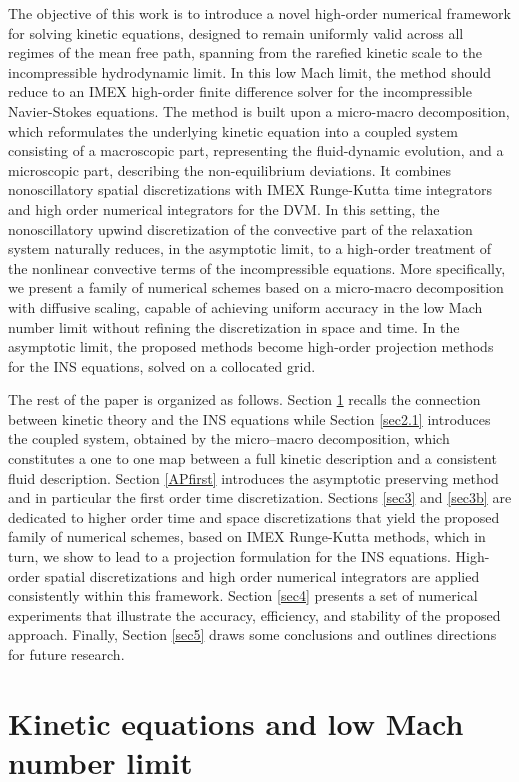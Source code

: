 \documentclass[final,11pt]{siamart251216}
\numberwithin{equation}{section}
\theoremstyle{definition}
\theoremstyle{remark}
\begin{document}
The objective of this work is to introduce a novel high-order numerical framework for solving kinetic equations, designed to remain uniformly valid across all regimes of the mean free path, spanning from the rarefied kinetic scale to the incompressible  hydrodynamic limit. In this low Mach limit, the method should reduce to an IMEX high-order finite difference solver for the incompressible Navier-Stokes equations. The method is built upon a micro-macro decomposition, which reformulates the underlying kinetic equation into a coupled system consisting of a macroscopic part, representing the fluid-dynamic evolution, and a microscopic part, describing the non-equilibrium deviations.
It combines nonoscillatory spatial discretizations with IMEX Runge-Kutta time integrators and high order numerical integrators for the DVM. In this setting, the nonoscillatory upwind discretization of the convective part of the relaxation system naturally reduces, in the asymptotic limit, to a high-order treatment of the nonlinear convective terms of the incompressible equations. More specifically, we present a family of numerical schemes based on a micro-macro decomposition with diffusive scaling, capable of achieving uniform accuracy in the low Mach number limit without refining the discretization in space and time. In the asymptotic limit, the proposed methods become high-order projection methods for the INS equations, solved on a collocated grid.


The rest of the paper is organized as follows. Section \ref{sec2} recalls the connection between kinetic theory and the INS equations while Section \ref{sec2.1} introduces the coupled system, obtained by the micro--macro decomposition, which constitutes a one to one map between a full kinetic description and a consistent fluid description. Section \ref{APfirst} introduces the asymptotic preserving method and in particular the first order time discretization. Sections \ref{sec3} and \ref{sec3b} are dedicated to higher order  time and space discretizations that yield the proposed family of numerical schemes, based on IMEX Runge-Kutta methods, which in turn, we show to lead to a projection formulation for the INS equations. High-order spatial discretizations and high order numerical integrators are  applied consistently within this framework. Section \ref{sec4} presents a set of numerical experiments that illustrate the accuracy, efficiency, and stability of the proposed approach. Finally, Section \ref{sec5} draws some conclusions and outlines directions for future research.
\section{Kinetic equations and low Mach number limit}\label{sec2}
\end{document}
